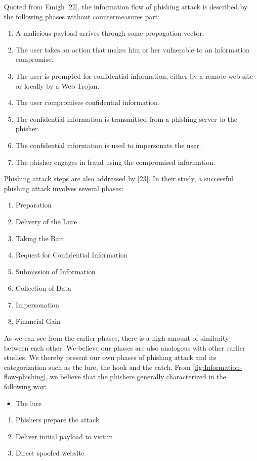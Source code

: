 Quoted from Emigh {[}22{]}, the information flow of phishing attack
is described by the following phases without countermeasures part:
\begin{enumerate}
\item A malicious payload arrives through some propagation vector. 
\item The user takes an action that makes him or her vulnerable to an information
compromise. 
\item The user is prompted for confidential information, either by a remote
web site or locally by a Web Trojan. 
\item The user compromises confidential information. 
\item The confidential information is transmitted from a phishing server
to the phisher. 
\item The confidential information is used to impersonate the user. 
\item The phisher engages in fraud using the compromised information. 
\end{enumerate}
Phishing attack steps are also addressed by {[}23{]}. In their study,
a successful phishing attack involves several phases: 
\begin{enumerate}
\item Preparation 
\item Delivery of the Lure 
\item Taking the Bait 
\item Request for Confidential Information 
\item Submission of Information 
\item Collection of Data 
\item Impersonation 
\item Financial Gain
\end{enumerate}
As we can see from the earlier phases, there is a high amount of similarity
between each other. We believe our phases are also analogous with
other earlier studies. We thereby present our own phases of phishing
attack and its categorization such as the lure, the hook and the catch.
From \autoref{fig:Information-flow-phishing}, we believe that the
phishers generally characterized in the following way:
\begin{itemize}
\item The lure \end{itemize}
\begin{enumerate}
\item Phishers prepare the attack 
\item Deliver initial payload to victim 
\item Direct spoofed website \end{enumerate}

